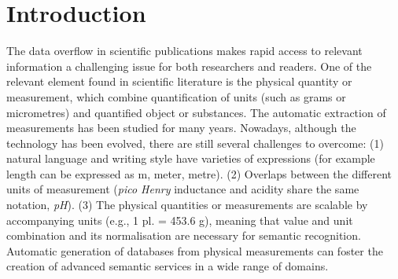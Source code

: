\documentclass[sigconf]{acmart}
\begin{document}


\maketitle

\section{Introduction}

The data overflow in scientific publications makes rapid access to relevant information a challenging issue for both researchers and readers. 
One of the relevant element found in scientific literature is the physical quantity or measurement, which combine quantification of units (such as grams or micrometres) and quantified object or substances. The automatic extraction of measurements has been studied for many years. Nowadays, although the technology has been evolved, there are still several challenges to overcome: (1) natural language and writing style have varieties of expressions (for example length can be expressed as m, meter, metre). (2) Overlaps between the different units of measurement (\textit{pico Henry} inductance and acidity share the same notation, \textit{pH}). (3) The physical quantities or measurements are scalable by accompanying units (e.g., 1 pl. = 453.6 g), meaning that value and unit combination and its normalisation are necessary for semantic recognition. Automatic generation of databases from physical measurements can foster the creation of advanced semantic services in a wide range of domains. 
\end{document}
